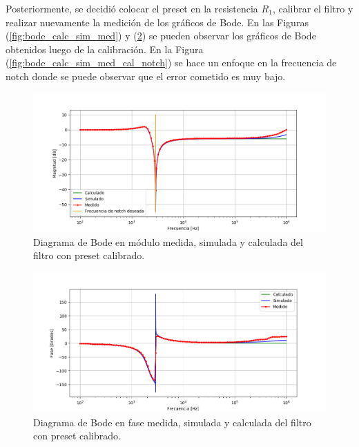 Posteriormente, se decidió colocar el preset en la resistencia $R_1$, calibrar el filtro y realizar nuevamente la medición de los gráficos de Bode. En las Figuras (\ref{fig:bode_calc_sim_med}) y (\ref{fig:bodefase_calc_sim_med_cal}) se pueden observar los gráficos de Bode obtenidos luego de la calibración. En la Figura (\ref{fig:bode_calc_sim_med_cal_notch}) se hace un enfoque en la frecuencia de notch donde se puede observar que el error cometido es muy bajo.

\begin{figure}[H]
	\centering
	\includegraphics[width=\textwidth]{Imagenes1/bode_calc_sim_med_calibrado.PNG}
	\caption{Diagrama de Bode en módulo medida, simulada y calculada del filtro con preset calibrado.}
	\label{fig:bode_calc_sim_med_cal}
\end{figure}

\begin{figure}[H]
	\centering
	\includegraphics[width=\textwidth]{Imagenes1/bodefase_calc_sim_med_calibrado.PNG}
	\caption{Diagrama de Bode en fase medida, simulada y calculada del filtro con preset calibrado.}
	\label{fig:bodefase_calc_sim_med_cal}
\end{figure}

